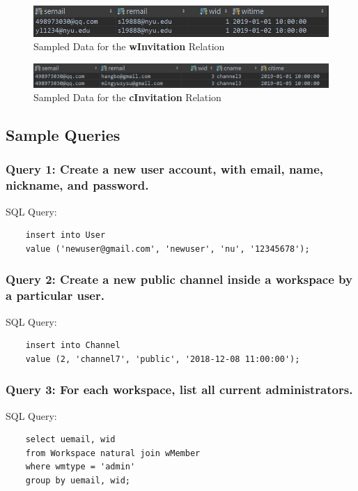 \FloatBarrier

\begin{figure}[ht!]
    \centering
    \includegraphics[width=1.0\textwidth]{img/wInvitation.JPG}
    \caption{Sampled Data for the \textbf{wInvitation} Relation}
\end{figure}

\FloatBarrier

\begin{figure}[ht!]
    \centering
    \includegraphics[width=1.0\textwidth]{img/cInvitation.JPG}
    \caption{Sampled Data for the \textbf{cInvitation} Relation}
\end{figure}

\FloatBarrier

\newpage

\subsection{Sample Queries}

\subsubsection{Query 1: Create a new user account, with email, name, nickname, and password.}
SQL Query:
\begin{verbatim}
    insert into User
    value ('newuser@gmail.com', 'newuser', 'nu', '12345678');
\end{verbatim}

\subsubsection{Query 2: Create a new public channel inside a workspace by a particular user.}
SQL Query:
\begin{verbatim}
    insert into Channel
    value (2, 'channel7', 'public', '2018-12-08 11:00:00');
\end{verbatim}

\subsubsection{Query 3: For each workspace, list all current administrators.}
SQL Query:
\begin{verbatim}
    select uemail, wid
    from Workspace natural join wMember
    where wmtype = 'admin'
    group by uemail, wid;
\end{verbatim}

